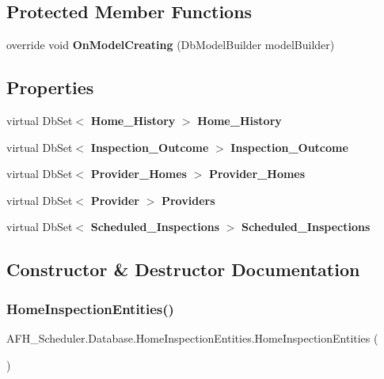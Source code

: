 \subsection*{Protected Member Functions}
\begin{DoxyCompactItemize}
\item 
override void \textbf{ On\+Model\+Creating} (Db\+Model\+Builder model\+Builder)
\end{DoxyCompactItemize}
\subsection*{Properties}
\begin{DoxyCompactItemize}
\item 
virtual Db\+Set$<$ \textbf{ Home\+\_\+\+History} $>$ \textbf{ Home\+\_\+\+History}\hspace{0.3cm}{\ttfamily  [get, set]}
\item 
virtual Db\+Set$<$ \textbf{ Inspection\+\_\+\+Outcome} $>$ \textbf{ Inspection\+\_\+\+Outcome}\hspace{0.3cm}{\ttfamily  [get, set]}
\item 
virtual Db\+Set$<$ \textbf{ Provider\+\_\+\+Homes} $>$ \textbf{ Provider\+\_\+\+Homes}\hspace{0.3cm}{\ttfamily  [get, set]}
\item 
virtual Db\+Set$<$ \textbf{ Provider} $>$ \textbf{ Providers}\hspace{0.3cm}{\ttfamily  [get, set]}
\item 
virtual Db\+Set$<$ \textbf{ Scheduled\+\_\+\+Inspections} $>$ \textbf{ Scheduled\+\_\+\+Inspections}\hspace{0.3cm}{\ttfamily  [get, set]}
\end{DoxyCompactItemize}


\subsection{Constructor \& Destructor Documentation}
\mbox{\label{class_a_f_h___scheduler_1_1_database_1_1_home_inspection_entities_a9b924c43e1c70be915706b9fa12c845b}} 
\subsubsection{HomeInspectionEntities()}
{\footnotesize\ttfamily A\+F\+H\+\_\+\+Scheduler.\+Database.\+Home\+Inspection\+Entities.\+Home\+Inspection\+Entities (\begin{DoxyParamCaption}{ }\end{DoxyParamCaption})}



